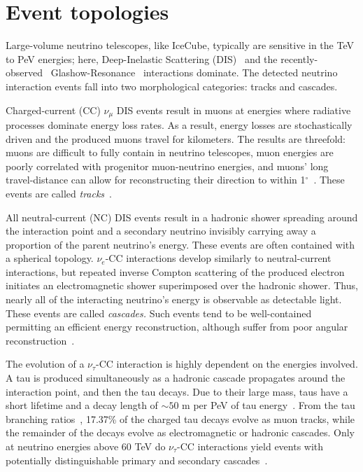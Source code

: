\documentclass[main.tex]{subfiles}
\begin{document}
\section{Event topologies}\label{sec:event_morphology}

Large-volume neutrino telescopes, like IceCube, typically are sensitive in the TeV to PeV energies; here, Deep-Inelastic Scattering (DIS)~\cite{gandhineutrinos} and the recently-observed~\cite{IceCube:2021rpz} Glashow-Resonance~\cite{PhysRev.118.316} interactions dominate. 
The detected neutrino interaction events fall into two morphological categories: tracks and cascades.

Charged-current (CC) $\nu_{\mu}$ DIS events result in muons at energies where radiative processes dominate energy loss rates.
As a result, energy losses are stochastically driven and the produced muons travel for kilometers. 
The results are threefold: muons are difficult to fully contain in neutrino telescopes, muon energies are poorly correlated with progenitor muon-neutrino energies, and muons' long travel-distance can allow for reconstructing their direction to within 1$^{\circ}$~\cite{trackaccuracy2017}. These events are called \textit{tracks}~\cite{icecube_energy_reco}.

All neutral-current (NC) DIS events result in a hadronic shower spreading around the interaction point and a secondary neutrino invisibly carrying away a proportion of the parent neutrino's energy. 
These events are often contained with a spherical topology. 
$\nu_{e}$-CC interactions develop similarly to neutral-current interactions, but repeated inverse Compton scattering of the produced electron initiates an electromagnetic shower superimposed over the hadronic shower. 
Thus, nearly all of the interacting neutrino's energy is observable as detectable light. 
These events are called \textit{cascades.} Such events tend to be well-contained permitting an efficient energy reconstruction, although suffer from poor angular reconstruction~\cite{icecube_energy_reco}. 

The evolution of a $\nu_{\tau}$-CC interaction is highly dependent on the energies involved. A tau is produced simultaneously as a hadronic cascade propagates around the interaction point, and then the tau decays. 
Due to their large mass, taus have a short lifetime and a decay length of $\sim 50$ m per PeV of tau energy~\cite{abbasi2020measurement}. 
From the tau branching ratios~\cite{PhysRevD.98.030001}, 17.37\% of the charged tau decays evolve as muon tracks, while the remainder of the decays evolve as electromagnetic or hadronic cascades. Only at neutrino energies above 60 TeV do $\nu_{\tau}$-CC interactions yield events with potentially distinguishable primary and secondary cascades~\cite{abbasi2020measurement}.
\end{document}

